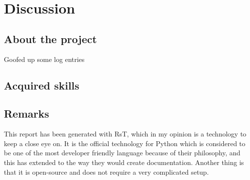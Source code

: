 \chapter{Discussion}

\section{About the project}\label{about-the-project}

Goofed up some log entries


\section{Acquired skills}\label{acquired-skills}



\section{Remarks}\label{discussion-remarks}

This report has been generated with RsT, which in my opinion is a
technology to keep a close eye on. It is the official technology for
Python which is considered to be one of the most developer friendly
language because of their philosophy, and this has extended to the way
they would create documentation. Another thing is that it is open-source
and does not require a very complicated setup.
